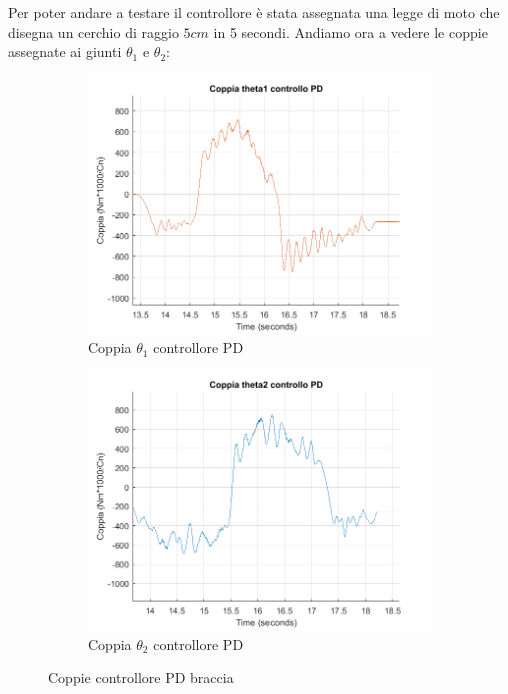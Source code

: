 \par Per poter andare a testare il controllore è stata assegnata una legge di moto che disegna un cerchio di raggio $5cm$ in 5 secondi. Andiamo ora a vedere le coppie assegnate ai giunti $\theta_1$ e $\theta_2$:
\begin{figure}[!ht]
\begin{subfigure}{.5\textwidth}
  \centering
  \includegraphics[width=1\linewidth]{Immagini/Traiettorie/CoppiaT1PD}  
  \caption{Coppia $\theta_1$ controllore PD}
  \label{fig:sub-coppiaPD1}
\end{subfigure}
\begin{subfigure}{.5\textwidth}
  \centering
  \includegraphics[width=1\linewidth]{Immagini/Traiettorie/CoppiaT2PD}  
  \caption{Coppia $\theta_2$ controllore PD}
  \label{fig:sub-coppiaPD2}
\end{subfigure}
\caption{Coppie controllore PD braccia}
\end{figure}

